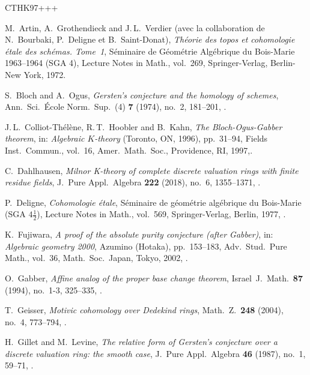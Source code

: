 \documentclass[11pt]{amsart}
\numberwithin{equation}{section}
\newtheorem{Key lemma}[theorem]{Key lemma}
\theoremstyle{definition}
\theoremstyle{remark}
\begin{document}
\begin{thebibliography}{CTHK97+++}

M.~Artin, A.~Grothendieck and J.\,L.~Verdier (avec la collaboration de N.~Bourbaki, P.~Deligne et B.~Saint-Donat), \emph{Th\'{e}orie des topos et cohomologie \'{e}tale des sch\'{e}mas. Tome~1}, S\'{e}minaire de G\'{e}om\'{e}trie Alg\'{e}brique du Bois-Marie 1963--1964 (SGA 4), Lecture Notes in Math., vol.~269, Springer-Verlag, Berlin-New York, 1972.

S.~Bloch and A.~Ogus, \emph{Gersten's conjecture and the homology of schemes},
Ann.\ Sci.\ \'Ecole Norm.\ Sup.\ (4) \textbf{7} (1974), no.~2, 181--201,
.

J.\,L.~Colliot-Th\'el\`ene, R.\,T.~Hoobler and B.~Kahn, \emph{The
  {B}loch-{O}gus-{G}abber theorem}, in: \emph{Algebraic {$K$}-theory} ({T}oronto, {ON}, 1996),  pp.~31--94, Fields Inst.\ Commun., vol.~16, Amer.\ Math.\ Soc., Providence, RI, 1997,.

C.~Dahlhausen, \emph{Milnor {K}-theory of complete discrete valuation rings
  with finite residue fields}, J.\ Pure Appl.\ Algebra \textbf{222} (2018),
  no.~6, 1355--1371, .

P.~Deligne, \emph{Cohomologie \'{e}tale}, S\'{e}minaire de g\'{e}om\'{e}trie
  alg\'{e}brique du Bois-Marie (SGA $4\frac{1}{2}$), Lecture Notes in Math., vol.~569, Springer-Verlag, Berlin, 1977, .
  
K.~Fujiwara, \emph{A proof of the absolute purity conjecture (after {G}abber)},
 in: \emph{Algebraic geometry 2000}, {A}zumino ({H}otaka), pp.~153--183, Adv.\ Stud.\ Pure Math.,  vol.~36, Math.\ Soc.\ Japan, Tokyo, 2002, .
 
O.~Gabber, \emph{Affine analog of the proper base change theorem}, Israel~J.\
  Math.\ \textbf{87} (1994), no.~1-3, 325--335,
  .

T.~Geisser, \emph{Motivic cohomology over {D}edekind rings}, Math.~Z.\
  \textbf{248} (2004), no.~4, 773--794, .

\bibitem[GL87]{GL87}
H.~Gillet and M.~Levine, \emph{The relative form of {G}ersten's conjecture over
  a discrete valuation ring: the smooth case}, J.~Pure Appl.\ Algebra
  \textbf{46} (1987), no.~1, 59--71, \doi{10.1016/0022-4049(87)90043-0}.


\end{thebibliography}
\end{document}
